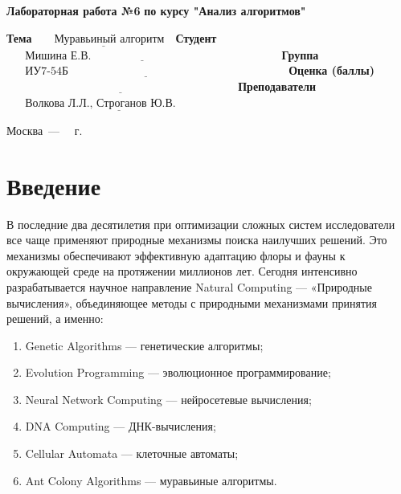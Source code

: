 \documentclass[12pt, a4paper]{report}
\begin{document}
\begin{titlepage}
		
		\begin{center}
			\Large\textbf{Лабораторная работа №6}\newline
			\Large\textbf{по курсу "Анализ алгоритмов"}\newline
		\end{center}
	
		\noindent\textbf{Тема} $\underline{\text{~~~~~Муравьиный алгоритм~~}}$\newline\newline\newline
		\noindent\textbf{Студент} $\underline{\text{~~~~~Мишина Е.В.~~~~~~~~~~~~~~~~~~~~~~~~~~~~~~~~~~~~~~~~~~~~~~~~~~}}$\newline\newline
		\noindent\textbf{Группа} $\underline{\text{~~~~~ИУ7-54Б~~~~~~~~~~~~~~~~~~~~~~~~~~~~~~~~~~~~~~~~~~~~~~~~~~~~~~~~~~}}$\newline\newline
		\noindent\textbf{Оценка (баллы)} $\underline{\text{~~~~~~~~~~~~~~~~~~~~~~~~~~~~~~~~~~~~~~~~~~~~~~~~~~~~~~~~~~~~~}}$\newline\newline
		\noindent\textbf{Преподаватели} $\underline{\text{~~~~~Волкова Л.Л., Строганов Ю.В.~~~~~~~~~~~~~~~}}$\newline
		
		\begin{center}
			\vfill
			Москва~---~\the\year
			~г.
		\end{center}
	\restoregeometry
	\end{titlepage}
 	
 	\tableofcontents
	\newpage
	
	\chapter*{Введение}
	
	
	В последние два десятилетия при оптимизации сложных систем исследователи все чаще применяют природные механизмы поиска наилучших решений. Это механизмы обеспечивают эффективную адаптацию флоры и фауны к окружающей среде на протяжении миллионов лет. Сегодня интенсивно разрабатывается научное направление Natural Computing — «Природные вычисления», объединяющее методы с природными механизмами принятия решений, а именно:
	\begin{enumerate}
	\item Genetic Algorithms — генетические алгоритмы;
	\item Evolution Programming — эволюционное программирование;
	\item Neural Network Computing — нейросетевые вычисления;
	\item DNA Computing — ДНК-вычисления;
	\item Cellular Automata — клеточные автоматы;
	\item Ant Colony Algorithms — муравьиные алгоритмы.
	\end{enumerate}
\end{document}
